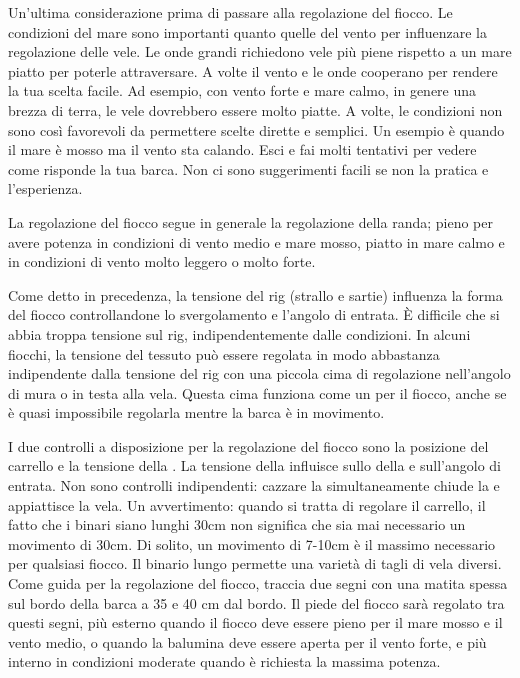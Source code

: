 Un'ultima considerazione prima di passare alla regolazione del fiocco. Le
condizioni del mare sono importanti quanto quelle del vento per influenzare la
regolazione delle vele. Le onde grandi richiedono vele più piene rispetto a un
mare piatto per poterle attraversare. A volte il vento e le onde cooperano per
rendere la tua scelta facile. Ad esempio, con vento forte e mare calmo, in
genere una brezza di terra, le vele dovrebbero essere molto piatte. A volte, le
condizioni non sono così favorevoli da permettere scelte dirette e semplici. Un
esempio è quando il mare è mosso ma il vento sta calando. Esci e fai molti
tentativi per vedere come risponde la tua barca. Non ci sono suggerimenti facili
se non la pratica e l'esperienza.

La regolazione del fiocco segue in generale la regolazione della randa; pieno
per avere potenza in condizioni di vento medio e mare mosso, piatto in mare
calmo e in condizioni di vento molto leggero o molto forte.

Come detto in precedenza, la tensione del rig (strallo e sartie) influenza la
forma del fiocco controllandone lo svergolamento e l'angolo di entrata. È
difficile che si abbia troppa tensione sul rig, indipendentemente dalle
condizioni. In alcuni fiocchi, la tensione del tessuto può essere regolata in
modo abbastanza indipendente dalla tensione del rig con una piccola cima di
regolazione nell'angolo di mura o in testa alla vela. Questa cima funziona come
un \cunningham per il fiocco, anche se è quasi impossibile regolarla mentre la
barca è in movimento.

I due controlli a disposizione per la regolazione del fiocco sono la posizione
del carrello e la tensione della \sheet. La tensione della \sheet influisce
sullo \twist della \leech e sull'angolo di entrata. Non sono controlli
indipendenti: cazzare la \sheet simultaneamente chiude la \leech e appiattisce
la vela. Un avvertimento: quando si tratta di regolare il carrello, il fatto che
i binari siano lunghi 30cm non significa che sia mai necessario un movimento di
30cm. Di solito, un movimento di 7-10cm è il massimo necessario per qualsiasi
fiocco. Il binario lungo permette una varietà di tagli di vela diversi. Come
guida per la regolazione del fiocco, traccia due segni con una matita spessa sul
bordo della barca a 35 e 40 cm dal bordo. Il piede del fiocco sarà regolato tra
questi segni, più esterno quando il fiocco deve essere pieno per il mare mosso e
il vento medio, o quando la balumina deve essere aperta per il vento forte, e
più interno in condizioni moderate quando è richiesta la massima potenza.


